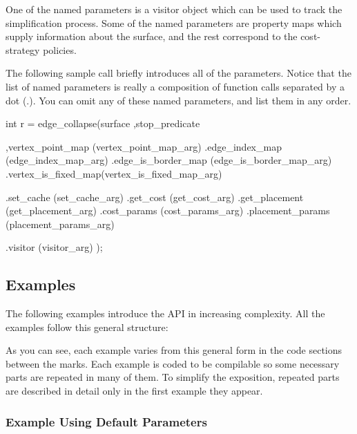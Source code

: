 One of the named parameters is a visitor object which can be used to track the simplification 
process. Some of the named parameters are property maps which supply information about 
the surface, and the rest correspond to the cost-strategy policies. 

The following sample call briefly introduces all of the parameters.
Notice that the list of named parameters is really a composition
of function calls separated by a dot ($.$). You can omit any of these named parameters, 
and list them in any order.

\begin{cprog}
int r = edge_collapse(surface
                     ,stop_predicate
                     
                     ,vertex_point_map   (vertex_point_map_arg)
                     .edge_index_map     (edge_index_map_arg)
                     .edge_is_border_map (edge_is_border_map_arg)
                     .vertex_is_fixed_map(vertex_is_fixed_map_arg)
                     
                     .set_cache          (set_cache_arg)
                     .get_cost           (get_cost_arg)
                     .get_placement      (get_placement_arg)
                     .cost_params        (cost_params_arg)
                     .placement_params   (placement_params_arg)
                     
                     .visitor            (visitor_arg)
                     );
\end{cprog}

\subsection{Examples}

The following examples introduce the API in increasing complexity. All the examples follow 
this general structure:


As you can see, each example varies from this general form in the code sections between 
the marks. Each example is coded to be compilable so some necessary parts are repeated 
in many of them. To simplify the exposition, repeated parts are described in detail 
only in the first example they appear.

\subsubsection{Example Using Default Parameters}

